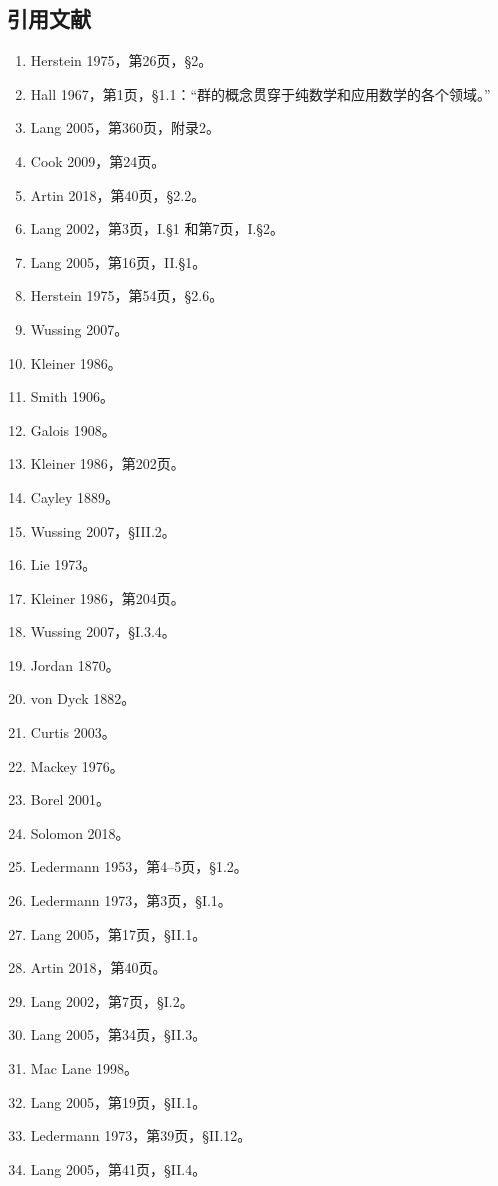 \subsection{引用文献}  
\begin{enumerate}
\item Herstein 1975，第26页，§2。  
\item Hall 1967，第1页，§1.1：“群的概念贯穿于纯数学和应用数学的各个领域。”  
\item Lang 2005，第360页，附录2。  
\item Cook 2009，第24页。  
\item Artin 2018，第40页，§2.2。  
\item Lang 2002，第3页，I.§1 和第7页，I.§2。  
\item Lang 2005，第16页，II.§1。  
\item Herstein 1975，第54页，§2.6。  
\item Wussing 2007。  
\item Kleiner 1986。  
\item Smith 1906。  
\item Galois 1908。  
\item Kleiner 1986，第202页。  
\item Cayley 1889。  
\item Wussing 2007，§III.2。  
\item Lie 1973。  
\item Kleiner 1986，第204页。  
\item Wussing 2007，§I.3.4。  
\item Jordan 1870。  
\item von Dyck 1882。
\item Curtis 2003。  
\item Mackey 1976。  
\item Borel 2001。  
\item Solomon 2018。  
\item Ledermann 1953，第4–5页，§1.2。  
\item Ledermann 1973，第3页，§I.1。  
\item Lang 2005，第17页，§II.1。  
\item Artin 2018，第40页。  
\item Lang 2002，第7页，§I.2。  
\item Lang 2005，第34页，§II.3。  
\item Mac Lane 1998。  
\item Lang 2005，第19页，§II.1。  
\item Ledermann 1973，第39页，§II.12。  
\item Lang 2005，第41页，§II.4。  

\end{enumerate}
